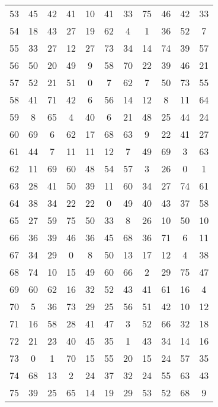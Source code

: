 \begin{table}
\begin{tabular}{c c c c c c c c c c c }
53 & 45 & 42 & 41 & 10 & 41 & 33 & 75 & 46 & 42 & 33 \\
54 & 18 & 43 & 27 & 19 & 62 & 4 & 1 & 36 & 52 & 7 \\
55 & 33 & 27 & 12 & 27 & 73 & 34 & 14 & 74 & 39 & 57 \\
56 & 50 & 20 & 49 & 9 & 58 & 70 & 22 & 39 & 46 & 21 \\
57 & 52 & 21 & 51 & 0 & 7 & 62 & 7 & 50 & 73 & 55 \\
58 & 41 & 71 & 42 & 6 & 56 & 14 & 12 & 8 & 11 & 64 \\
59 & 8 & 65 & 4 & 40 & 6 & 21 & 48 & 25 & 44 & 24 \\
60 & 69 & 6 & 62 & 17 & 68 & 63 & 9 & 22 & 41 & 27 \\
61 & 44 & 7 & 11 & 11 & 12 & 7 & 49 & 69 & 3 & 63 \\
62 & 11 & 69 & 60 & 48 & 54 & 57 & 3 & 26 & 0 & 1 \\
63 & 28 & 41 & 50 & 39 & 11 & 60 & 34 & 27 & 74 & 61 \\
64 & 38 & 34 & 22 & 22 & 0 & 49 & 40 & 43 & 37 & 58 \\
65 & 27 & 59 & 75 & 50 & 33 & 8 & 26 & 10 & 50 & 10 \\
66 & 36 & 39 & 46 & 36 & 45 & 68 & 36 & 71 & 6 & 11 \\
67 & 34 & 29 & 0 & 8 & 50 & 13 & 17 & 12 & 4 & 38 \\
68 & 74 & 10 & 15 & 49 & 60 & 66 & 2 & 29 & 75 & 47 \\
69 & 60 & 62 & 16 & 32 & 52 & 43 & 41 & 61 & 16 & 4 \\
70 & 5 & 36 & 73 & 29 & 25 & 56 & 51 & 42 & 10 & 12 \\
71 & 16 & 58 & 28 & 41 & 47 & 3 & 52 & 66 & 32 & 18 \\
72 & 21 & 23 & 40 & 45 & 35 & 1 & 43 & 34 & 14 & 16 \\
73 & 0 & 1 & 70 & 15 & 55 & 20 & 15 & 24 & 57 & 35 \\
74 & 68 & 13 & 2 & 24 & 37 & 32 & 24 & 55 & 63 & 43 \\
75 & 39 & 25 & 65 & 14 & 19 & 29 & 53 & 52 & 68 & 9 \\
\hline
\end{tabular}
\end{table}